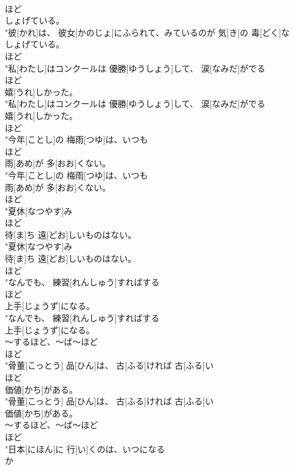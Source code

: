 \documentclass[8pt]{extreport}
\begin{document}
\begin{CJK}{UTF8}{min}
\\	ほど
\\	しょげている。
\\	"彼[かれ]は、 彼女[かのじょ]にふられて、みているのが 気[き]の 毒[どく]な
\\	しょげている。
\\	ほど
\\	"私[わたし]はコンクールは 優勝[ゆうしょう]して、 涙[なみだ]がでる
\\	ほど
\\	嬉[うれ]しかった。
\\	"私[わたし]はコンクールは 優勝[ゆうしょう]して、 涙[なみだ]がでる
\\	嬉[うれ]しかった。
\\	ほど
\\	"今年[ことし]の 梅雨[つゆ]は、いつも
\\	ほど
\\	雨[あめ]が 多[おお]くない。
\\	"今年[ことし]の 梅雨[つゆ]は、いつも
\\	雨[あめ]が 多[おお]くない。
\\	ほど
\\	"夏休[なつやす]み
\\	ほど
\\	待[ま]ち 遠[どお]しいものはない。
\\	"夏休[なつやす]み
\\	待[ま]ち 遠[どお]しいものはない。
\\	ほど
\\	"なんでも、 練習[れんしゅう]すればする
\\	ほど
\\	上手[じょうず]になる。
\\	"なんでも、 練習[れんしゅう]すればする
\\	上手[じょうず]になる。
\\	～するほど、～ば～ほど	
\\	ほど
\\	"骨董[こっとう] 品[ひん]は、 古[ふる]ければ 古[ふる]い
\\	ほど
\\	価値[かち]がある。
\\	"骨董[こっとう] 品[ひん]は、 古[ふる]ければ 古[ふる]い
\\	価値[かち]がある。
\\	～するほど、～ば～ほど	
\\	ほど
\\	"日本[にほん]に 行[い]くのは、いつになる
\\	か

\end{CJK}
\end{document}
